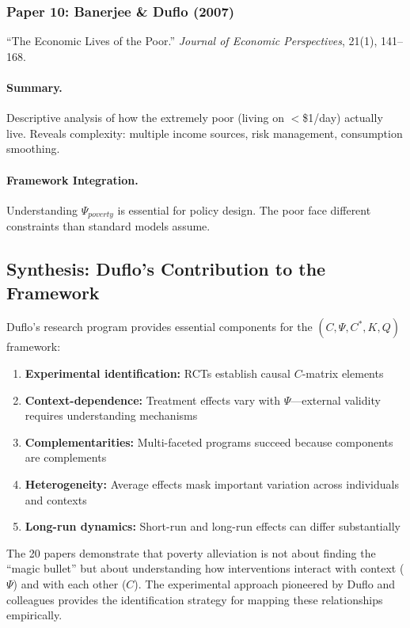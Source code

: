 \documentclass[12pt,a4paper]{article}
\begin{document}
\subsubsection{Paper 10: Banerjee \& Duflo (2007)}

``The Economic Lives of the Poor.''
\textit{Journal of Economic Perspectives}, 21(1), 141--168.

\paragraph{Summary.}
Descriptive analysis of how the extremely poor (living on $<$\$1/day) actually live.
Reveals complexity: multiple income sources, risk management, consumption smoothing.

\paragraph{Framework Integration.}
Understanding $\Psi_{poverty}$ is essential for policy design. The poor face
different constraints than standard models assume.

\subsection{Synthesis: Duflo's Contribution to the Framework}

Duflo's research program provides essential components for the $(C, \Psi, C^*, K, Q)$ framework:
\begin{enumerate}
  \item \textbf{Experimental identification:} RCTs establish causal $C$-matrix elements
  \item \textbf{Context-dependence:} Treatment effects vary with $\Psi$---external validity requires
        understanding mechanisms
  \item \textbf{Complementarities:} Multi-faceted programs succeed because components are complements
  \item \textbf{Heterogeneity:} Average effects mask important variation across individuals and contexts
  \item \textbf{Long-run dynamics:} Short-run and long-run effects can differ substantially
\end{enumerate}

The 20 papers demonstrate that poverty alleviation is not about finding the ``magic
bullet'' but about understanding how interventions interact with context ($\Psi$) and with
each other ($C$). The experimental approach pioneered by Duflo and colleagues provides
the identification strategy for mapping these relationships empirically.
\end{document}

